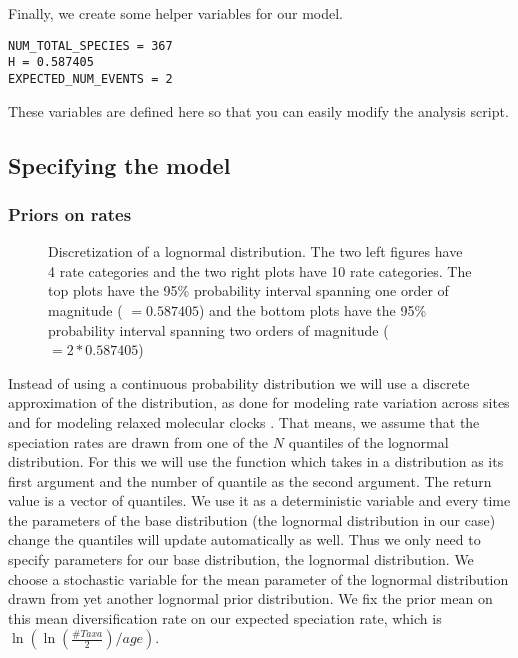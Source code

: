 Finally, we create some helper variables for our model.
{\tt \begin{snugshade*}
\begin{lstlisting}
NUM_TOTAL_SPECIES = 367
H = 0.587405
EXPECTED_NUM_EVENTS = 2
\end{lstlisting}
\end{snugshade*}}
These variables are defined here so that you can easily modify the analysis script.

\subsection{Specifying the model}

\subsubsection{Priors on rates}
\begin{figure}[htbp!]
\centering
{}
\caption{\small Discretization of a lognormal distribution. The two left figures have 4 rate categories and the two right plots have 10 rate categories. The top plots have the 95\% probability interval spanning one order of magnitude ( $=0.587405$) and the bottom plots have the 95\% probability interval spanning two orders of magnitude ( $=2*0.587405$)}
\label{fig:BSBD_discretization}
\end{figure}
Instead of using a continuous probability distribution we will use a discrete approximation of the distribution, as done for modeling rate variation across sites \citep{Yang1994a} and for modeling relaxed molecular clocks \citep{Drummond2006}.
That means, we assume that the speciation rates are drawn from one of the $N$ quantiles of the lognormal distribution.
For this we will use the function  which takes in a distribution as its first argument and the number of quantile as the second argument.
The return value is a vector of quantiles.
We use it as a deterministic variable and every time the parameters of the base distribution (\IE the lognormal distribution in our case) change the quantiles will update automatically as well.
Thus we only need to specify parameters for our base distribution, the lognormal distribution.
We choose a stochastic variable for the mean parameter of the lognormal distribution drawn from yet another lognormal prior distribution.
We fix the prior mean on this mean diversification rate on our expected speciation rate, which is $\ln( \ln(\frac{\#Taxa}{2})/age )$.
